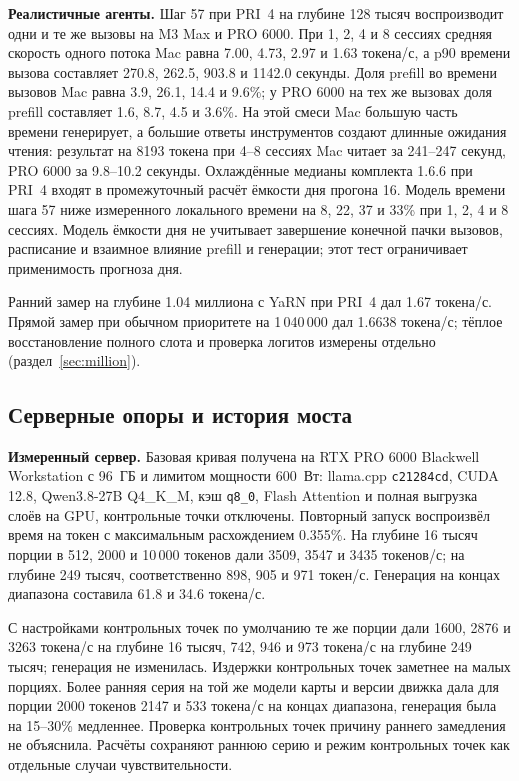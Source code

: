 \textbf{Реалистичные агенты.} Шаг 57 при PRI~4 на глубине 128 тысяч воспроизводит одни и те же вызовы
на M3 Max и PRO 6000. При 1, 2, 4 и 8 сессиях средняя скорость одного потока Mac равна
7.00, 4.73, 2.97 и 1.63 токена/с, а p90 времени вызова составляет 270.8, 262.5, 903.8 и 1142.0 секунды.
Доля prefill во времени вызовов Mac равна 3.9, 26.1, 14.4 и 9.6\%; у PRO 6000 на тех же вызовах
доля prefill составляет 1.6, 8.7, 4.5 и 3.6\%. На этой смеси Mac большую часть времени генерирует,
а большие ответы инструментов создают длинные ожидания чтения: результат на 8193 токена при
4--8 сессиях Mac читает за 241--247 секунд, PRO 6000 за 9.8--10.2 секунды.
Охлаждённые медианы комплекта 1.6.6 при PRI~4 входят в промежуточный расчёт ёмкости дня прогона 16.
Модель времени шага 57 ниже измеренного локального времени на 8, 22, 37 и 33\% при 1, 2, 4 и 8 сессиях.
Модель ёмкости дня не учитывает завершение конечной пачки вызовов, расписание и взаимное влияние prefill и генерации;
этот тест ограничивает применимость прогноза дня.

Ранний замер на глубине 1.04 миллиона с YaRN при PRI~4 дал 1.67 токена/с.
Прямой замер при обычном приоритете на 1\,040\,000 дал 1.6638 токена/с; тёплое восстановление полного слота
и проверка логитов измерены отдельно (раздел~\ref{sec:million}).

\subsection{Серверные опоры и история моста}
\label{app:server-methods}

\textbf{Измеренный сервер.} Базовая кривая получена на RTX PRO 6000 Blackwell Workstation
с 96~ГБ и лимитом мощности 600~Вт: llama.cpp \texttt{c21284cd}, CUDA 12.8, Qwen3.8-27B Q4\_K\_M,
кэш \texttt{q8\_0}, Flash Attention и полная выгрузка слоёв на GPU, контрольные точки отключены.
Повторный запуск воспроизвёл время на токен с максимальным расхождением 0.355\%.
На глубине 16 тысяч порции в 512, 2000 и 10\,000 токенов дали 3509, 3547 и 3435 токенов/с;
на глубине 249 тысяч, соответственно 898, 905 и 971 токен/с.
Генерация на концах диапазона составила 61.8 и 34.6 токена/с.

С настройками контрольных точек по умолчанию те же порции дали 1600, 2876 и 3263 токена/с
на глубине 16 тысяч, 742, 946 и 973 токена/с на глубине 249 тысяч; генерация не изменилась.
Издержки контрольных точек заметнее на малых порциях. Более ранняя серия на той же модели
карты и версии движка дала для порции 2000 токенов 2147 и 533 токена/с на концах диапазона,
генерация была на 15--30\% медленнее. Проверка контрольных точек причину раннего замедления
не объяснила. Расчёты сохраняют раннюю серию и режим контрольных точек как отдельные случаи чувствительности.

